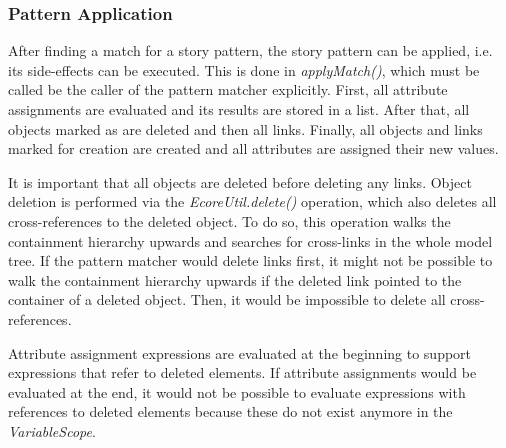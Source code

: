 \subsubsection{Pattern Application}
\label{sec:spm_pattern_application}

After finding a match for a story pattern, the story pattern can be applied, i.e. its side-effects can be executed.
This is done in \emph{applyMatch()}, which must be called be the caller of the pattern matcher explicitly.
First, all attribute assignments are evaluated and its results are stored in a list.
After that, all objects marked as \destroy are deleted and then all links.
Finally, all objects and links marked for creation are created and all attributes are assigned their new values.

It is important that all objects are deleted before deleting any links.
Object deletion is performed via the \emph{EcoreUtil.delete()} operation, which also deletes all cross-references to the deleted object.
To do so, this operation walks the containment hierarchy upwards and searches for cross-links in the whole model tree.
If the pattern matcher would delete links first, it might not be possible to walk the containment hierarchy upwards if the deleted link pointed to the container of a deleted object.
Then, it would be impossible to delete all cross-references.

Attribute assignment expressions are evaluated at the beginning to support expressions that refer to deleted elements. 
If attribute assignments would be evaluated at the end, it would not be possible to evaluate expressions with references to deleted elements because these do not exist anymore in the \emph{VariableScope}.


